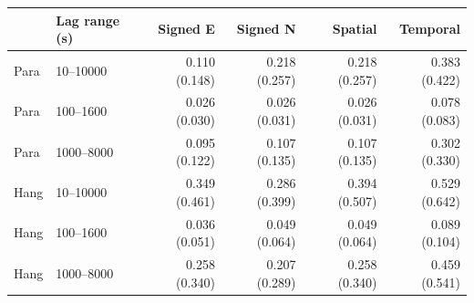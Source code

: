 \begin{tabular}{llrrrr}
\toprule
 & Lag range (s) & Signed E & Signed N & Spatial & Temporal\\
\midrule
Para & 10--10000 & 0.110 (0.148) & 0.218 (0.257) & 0.218 (0.257) & 0.383 (0.422)\\
Para & 100--1600 & 0.026 (0.030) & 0.026 (0.031) & 0.026 (0.031) & 0.078 (0.083)\\
Para & 1000--8000 & 0.095 (0.122) & 0.107 (0.135) & 0.107 (0.135) & 0.302 (0.330)\\
Hang & 10--10000 & 0.349 (0.461) & 0.286 (0.399) & 0.394 (0.507) & 0.529 (0.642)\\
Hang & 100--1600 & 0.036 (0.051) & 0.049 (0.064) & 0.049 (0.064) & 0.089 (0.104)\\
Hang & 1000--8000 & 0.258 (0.340) & 0.207 (0.289) & 0.258 (0.340) & 0.459 (0.541)\\
\bottomrule
\end{tabular}
